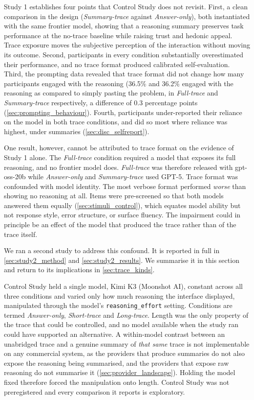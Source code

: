\documentclass[manuscript,review,anonymous]{acmart}
\begin{document}
Study 1 establishes four points that Control Study does not revisit. First, a clean comparison in the design (\textit{Summary-trace} against
\textit{Answer-only}), both instantiated with the same frontier model, showing that
a reasoning summary preserves task performance at the no-trace baseline while raising trust and hedonic appeal. Trace exposure moves the subjective perception of
the interaction without moving its outcome. Second, participants in every condition substantially overestimated their performance, and no trace format
produced calibrated self-evaluation. Third, the prompting data revealed that trace
format did not change how many participants engaged with the reasoning (36.5\% and 36.2\% engaged with the reasoning as compared to simply pasting the problem, in \textit{Full-trace} and \textit{Summary-trace} respectively, a difference of 0.3 percentage points (\autoref{sec:prompting_behaviour}). Fourth, participants under-reported their reliance on the model in both trace conditions, and did so most where reliance was highest, under summaries (\autoref{sec:disc_selfreport}).


One result, however, cannot be attributed to trace format on the evidence of
Study 1 alone. The \textit{Full-trace} condition required a model that exposes
its full reasoning, and no frontier model does. \textit{Full-trace} was therefore released with gpt-oss-20b while \textit{Answer-only} and \textit{Summary-trace} used GPT-5. Trace format was confounded with model identity. The most verbose format performed
\emph{worse} than showing no reasoning at all. Items were pre-screened so that both models answered them equally (\autoref{sec:stimuli_control}), which equates model ability but not response
style, error structure, or surface fluency. The impairment could in principle be
an effect of the model that produced the trace rather than of the trace itself.

We ran a second study to address this confound. It is reported in full in
\autoref{sec:study2_method} and \autoref{sec:study2_results}. We summarise it in this section and return to its implications in
\autoref{sec:trace_kinds}.

Control Study held a single model, Kimi K3 (Moonshot AI), constant across all
three conditions and varied only how much reasoning the interface displayed,
manipulated through the model's \texttt{reasoning\_effort} setting. Conditions
are termed \textit{Answer-only}, \textit{Short-trace} and \textit{Long-trace}.
Length was the only property of the trace that could be controlled, and no model available when the study ran could have supported an alternative. A within-model contrast between an unabridged trace and a genuine
summary of \emph{that same} trace is not implementable on any commercial system,
as the providers that produce summaries do not also expose the reasoning
being summarised, and the providers that expose raw reasoning do not summarise it
(\autoref{sec:provider_landscape}). Holding the model fixed therefore forced the manipulation onto length. Control Study was not preregistered and every comparison it reports is exploratory.
\end{document}
